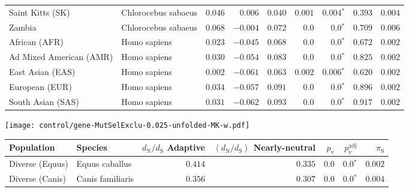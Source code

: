 \begin{center}
\begin{adjustbox}{width = 1\textwidth}
\begin{tabular}{|l|l|r|r|r|r|r|r|r|}
            Saint Kitts (SK)                  & Chlorocebus sabaeus        & $ 0.046$ & $ 0.006$  & $ 0.040$ & $ 0.001$    & $\bm{ 0.004{^*}}$    & $ 0.393$ & $ 0.004$ \\
            Zambia        & Chlorocebus sabaeus        & $ 0.068$ & $-0.004$  & $ 0.072$ & $0.0$    & $\bm{0.0{^*}}$ & $ 0.709$ & $ 0.006$ \\
            African (AFR)               & Homo sapiens        & $ 0.023$ & $-0.045$  & $ 0.068$ & $0.0$ & $\bm{0.0{^*}}$ & $ 0.672$ & $ 0.002$ \\
            Ad Mixed American (AMR)                 & Homo sapiens        & $ 0.030$ & $-0.054$  & $ 0.083$ & $0.0$    & $\bm{0.0{^*}}$    & $ 0.825$ & $ 0.002$ \\
            East Asian (EAS)              & Homo sapiens        & $ 0.002$ & $-0.061$  & $ 0.063$ & $ 0.002$    & $\bm{ 0.006{^*}}$    & $ 0.620$ & $ 0.002$ \\
            European (EUR)              & Homo sapiens        & $ 0.034$ & $-0.057$  & $ 0.091$ & $0.0$    & $\bm{0.0{^*}}$    & $ 0.896$ & $ 0.002$ \\
            South Asian (SAS)              & Homo sapiens        & $ 0.031$ & $-0.062$  & $ 0.093$ & $0.0$    & $\bm{0.0{^*}}$    & $ 0.917$ & $ 0.002$ \\
            \bottomrule
        \end{tabular}
    \end{adjustbox}
    \newpage
    \texttt{[image: control/gene-MutSelExclu-0.025-unfolded-MK-w.pdf]}
    \begin{adjustbox}{width = 1\textwidth}
        \begin{tabular}{|l|l|r|r|r|r|r|}
            \toprule
            Population & Species & \specialcell{$d_{\mathrm{N}} / d_{\mathrm{S}}$ \\ Adaptive}                & \specialcell{$\left< d_{\mathrm{N}} / d_{\mathrm{S}} \right>$ \\ Nearly-neutral}                & $p_{\mathrm{v}}$    & $p_{\mathrm{v}}^{\mathrm{adj}}$ & $\pi_{\textrm{S}}$ \\
            \midrule
            Diverse (Equus)                    & Equus caballus          & $ 0.414$ & $ 0.335$ & $0.0$ & $\bm{0.0{^*}}$        & $ 0.002$ \\
            Diverse (Canis)                  & Canis familiaris          & $ 0.356$ & $ 0.307$ & $0.0$ & $\bm{0.0{^*}}$        & $ 0.004$ \\

\end{tabular}
\end{adjustbox}
\end{center}
